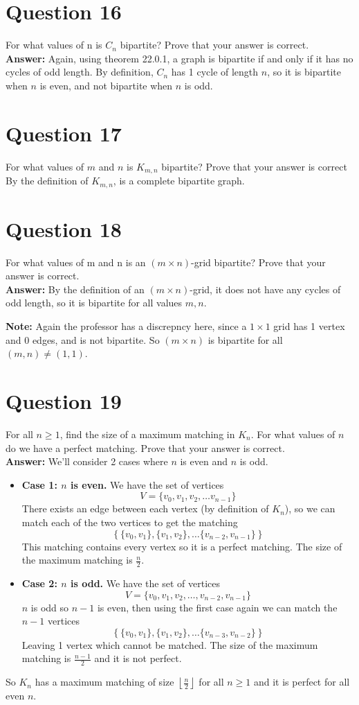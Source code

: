 \documentclass[openany]{report}
\begin{document}
\section{Question 16}
For what values of n is $C_n$ bipartite? Prove that your answer is correct.\\[2ex]
\textbf{Answer:} Again, using theorem 22.0.1, a graph is bipartite if and only if it has no cycles of odd length. By definition, $C_n$ has 1 cycle of length $n$, so it is bipartite when $n$ is even, and not bipartite when $n$ is odd.
\section{Question 17}
For what values of $m$ and $n$ is $K_{m,n}$ bipartite? Prove that your answer is correct\\[2ex]
By the definition of $K_{m,n}$, is a complete bipartite graph. 
\section{Question 18}
For what values of m and n is an $(m \times n)$-grid bipartite? Prove that your answer is
correct.\\[2ex]
\textbf{Answer:} By the definition of an $(m \times n)$-grid, it does not have any cycles of odd length, so it is bipartite for all values $m,n$.
\begin{center}
    \textbf{Note:} Again the professor has a discrepncy here, since a $1 \times 1$ grid has 1 vertex and 0 edges, and is not bipartite. So $(m\times n)$ is bipartite for all $(m,n) \neq (1,1)$.
\end{center}
\section{Question 19}
For all $n\geq 1$, find the size of a maximum matching in $K_n$. For what values of $n$ do we have a perfect matching. Prove that your answer is correct.\\[2ex]
\textbf{Answer:} We'll consider 2 cases where $n$ is even and $n$ is odd. 
\begin{itemize}
    \item \textbf{Case 1: $n$ is even.} We have the set of vertices 
    \[V = \{v_0, v_1, v_2, \ldots v_{n-1}\}\]
    There exists an edge between each vertex (by definition of $K_n$), so we can match each of the two vertices to get the matching 
    \[\left\{\{v_0, v_1\}, \{v_1, v_2\}, \ldots \{v_{n-2}, v_{n-1}\}\right\}\]
    This matching contains every vertex so it is a perfect matching. The size of the maximum matching is $\frac{n}{2}$.
    \item \textbf{Case 2: $n$ is odd.} We have the set of vertices
    \[V = \{v_0, v_1, v_2, \ldots, v_{n-2}, v_{n-1}\}\]
    $n$ is odd so $n-1$ is even, then using the first case again we can match the $n-1$ vertices 
    \[\left\{\{v_0, v_1\}, \{v_1, v_2\}, \ldots \{v_{n-3}, v_{n-2}\}\right\}\]
    Leaving 1 vertex which cannot be matched. The size of the maximum matching is $\frac{n-1}{2}$ and it is not perfect. 
\end{itemize}
So $K_n$ has a maximum matching of size $\left\lfloor\frac{n}{2}\right\rfloor$ for all $n \geq 1$ and it is perfect for all even $n$.
\end{document}
